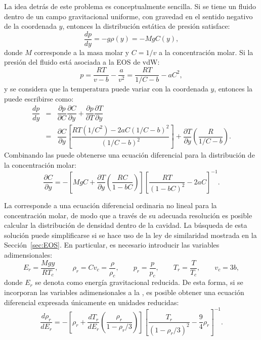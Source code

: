 La idea detr\'as de este problema es conceptualmente sencilla. Si se tiene un fluido dentro de un campo gravitacional uniforme, con gravedad en el sentido negativo de la coordenada $y$, entonces la distribuci\'on est\'atica de presi\'on satisface:
\begin{equation}
	\dfrac{dp}{dy} = -g\rho(y) = -MgC(y),
	\label{eq:p_hidrost}
\end{equation}
donde $M$ corresponde a la masa molar y $C=1/v$ a la concentraci\'on molar. Si la presi\'on del fluido est\'a asociada a la EOS de vdW:
\begin{equation}
	p = \dfrac{RT}{v-b} - \dfrac{a}{v^2} = \dfrac{RT}{1/C-b} - aC^2,
\end{equation}
y se considera que la temperatura puede variar con la coordenada $y$, entonces la  puede escribirse como:
\begin{equation}
	\begin{array}{rcl}
		\dfrac{dp}{dy} &=& \dfrac{\partial p }{\partial C} \dfrac{\partial C}{\partial y}	 + \dfrac{\partial p}{\partial T}\dfrac{\partial T}{\partial y} \\[3mm]
		&=& \dfrac{\partial C}{\partial y}\left[ \dfrac{RT(1/C^2)- 2aC(1/C-b)^2}{(1/C-b)^2} \right] + \dfrac{\partial T}{\partial y}\left( \dfrac{R}{1/C-b}\right).
	\end{array}
	\label{eq:partial_p}
\end{equation}
Combinando las  puede obtenerse una ecuaci\'on diferencial para la distribuci\'on de la concentraci\'on molar:
\begin{equation}
	\dfrac{\partial C}{\partial y} = -\left[ MgC + \dfrac{\partial T}{\partial y}\left( \dfrac{RC}{1-bC} \right) \right] \left[ \dfrac{RT}{(1-bC)^2} -2aC \right]^{-1}.
	\label{eq:vdw_molar}
\end{equation} 

La  corresponde a una ecuaci\'on diferencial ordinaria no lineal para la concentraci\'on molar, de modo que a trav\'es de su adecuada resoluci\'on es posible calcular la distribuci\'on de densidad dentro de la cavidad. 
La b\'usqueda de esta soluci\'on puede simplificarse si se hace uso de la ley de similaridad mostrada en la Secci\'on~\ref{sec:EOS}. En particular, es necesario introducir las variables adimensionales:
\begin{equation}
	E_r = \dfrac{Mgy}{RT_c}, \qquad \rho_r=Cv_c=\dfrac{\rho}{\rho_c}, \qquad p_r=\dfrac{p}{p_c}, \qquad T_r = \dfrac{T}{T_c}, \qquad v_c = 3b,
\end{equation}
donde $E_r$ se denota como energ\'ia gravitacional reducida. De esta forma, si se incorporan las variables adimensionales a la , es posible obtener una ecuaci\'on diferencial expresada \'unicamente en unidades reducidas:
\begin{equation}
	\dfrac{d\rho_r}{dE_r} = -\left[ \rho_r + \dfrac{dT_r}{dE_r} \left( \dfrac{\rho_r}{1-\rho_r/3} \right) \right]
\left[ \dfrac{T_r}{(1-\rho_r/3)^2} -\dfrac{9}{4}\rho_r \right]^{-1}.
	\label{eq:vdw_column_red}
\end{equation}

